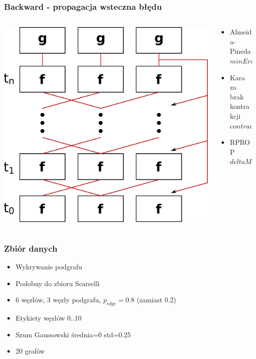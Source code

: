 \documentclass{beamer}
\begin{document}
\begin{frame}
\frametitle{Backward - propagacja wsteczna błędu}
\begin{columns}
	\begin{column}{0.66\textwidth}
		\includegraphics[scale=0.2]{img/backward}
	\end{column}
	\begin{column}{0.34\textwidth}
		\begin{itemize}
			\item Almeida-Pineda
			\\$minErrorDiff$
			\item Kara za brak kontrakcji
			\\$contracionConstant$
			\item RPROP
			\\$deltaMax$
		\end{itemize}
	\end{column}
\end{columns}
\end{frame}

\begin{frame}
\frametitle{Zbiór danych}
\begin{itemize}
	\item Wykrywanie podgrafu
	\item Podobny do zbioru Scarselli
	\item 6 węzłów, 3 węzły podgrafu, $p_{edge} = 0.8$ (zamiast 0.2)
	\item Etykiety węzłów 0..10
	\item Szum Gaussowski średnia=0 std=0.25
	\item 20 grafów
\end{itemize}
\end{frame}
\end{document}
